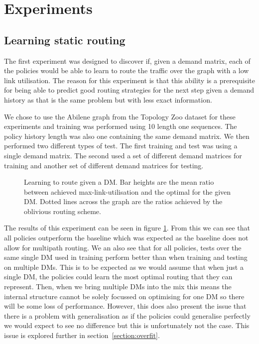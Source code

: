 \section{Experiments}

\subsection{Learning static routing}
\label{section:exp_static}
The first experiment was designed to discover if, given a demand matrix, each of the policies would be able to learn to route the traffic over the graph with a low link utilisation. The reason for this experiment is that this ability is a prerequisite for being able to predict good routing strategies for the next step given a demand history as that is the same problem but with less exact information.

We chose to use the Abilene graph from the Topology Zoo dataset for these experiments and training was performed using 10 length one sequences. The policy history length was also one containing the same demand matrix. We then performed two different types of test. The first training and test was using a single demand matrix. The second used a set of different demand matrices for training and another set of different demand matrices for testing.

\begin{figure}
    \centering
    
    \caption{Learning to route given a DM. Bar heights are the mean ratio between achieved max-link-utilisation and the optimal for the given DM. Dotted lines across the graph are the ratios achieved by the oblivious routing scheme.}
    \label{fig:exp_static}
\end{figure}

The results of this experiment can be seen in figure \ref{fig:exp_static}. From this we can see that all policies outperform the baseline which was expected as the baseline does not allow for multipath routing. We an also see that for all policies, tests over the same single DM used in training perform better than when training and testing on multiple DMs. This is to be expected as we would assume that when just a single DM, the policies could learn the most optimal routing that they can represent. Then, when we bring multiple DMs into the mix this means the internal structure cannot be solely focussed on optimising for one DM so there will be some loss of performance. However, this does also present the issue that there is a problem with generalisation as if the policies could generalise perfectly we would expect to see no difference but this is unfortunately not the case. This issue is explored further in section~\ref{section:overfit}.


